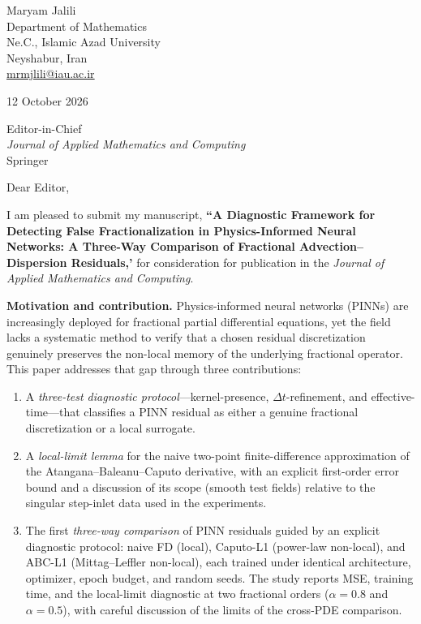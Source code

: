 \documentclass[11pt,a4paper]{article}
\begin{document}
Maryam Jalili \\
Department of Mathematics \\
 Ne.C., Islamic Azad University \\
Neyshabur, Iran \\
\href{mailto:mrmjlili@iau.ac.ir}{mrmjlili@iau.ac.ir}

12 October 2026

Editor-in-Chief \\
\emph{Journal of Applied Mathematics and Computing} \\
Springer

Dear Editor,

I am pleased to submit my manuscript, \textbf{``A Diagnostic Framework for Detecting False Fractionalization in Physics-Informed Neural Networks: A Three-Way Comparison of Fractional Advection--Dispersion Residuals,'} for consideration for publication in the \emph{Journal of Applied Mathematics and Computing}.

\textbf{Motivation and contribution.} Physics-informed neural networks (PINNs) are increasingly deployed for fractional partial differential equations, yet the field lacks a systematic method to verify that a chosen residual discretization genuinely preserves the non-local memory of the underlying fractional operator. This paper addresses that gap through three contributions:

\begin{enumerate}
\item A \emph{three-test diagnostic protocol}---kernel-presence, $\Delta t$-refinement, and effective-time---that classifies a PINN residual as either a genuine fractional discretization or a local surrogate.
\item A \emph{local-limit lemma} for the naive two-point finite-difference approximation of the Atangana--Baleanu--Caputo derivative, with an explicit first-order error bound and a discussion of its scope (smooth test fields) relative to the singular step-inlet data used in the experiments.
\item The first \emph{three-way comparison} of PINN residuals guided by an explicit diagnostic protocol: naive FD (local), Caputo-L1 (power-law non-local), and ABC-L1 (Mittag--Leffler non-local), each trained under identical architecture, optimizer, epoch budget, and random seeds. The study reports MSE, training time, and the local-limit diagnostic at two fractional orders ($\alpha = 0.8$ and $\alpha = 0.5$), with careful discussion of the limits of the cross-PDE comparison.
\end{enumerate}
\end{document}
